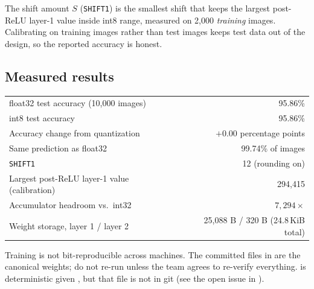\documentclass[11pt]{article}
\begin{document}
The shift amount $S$ (\texttt{SHIFT1}) is the smallest shift that keeps the
largest post-ReLU layer-1 value inside int8 range, measured on 2{,}000
\emph{training} images. Calibrating on training images rather than test images
keeps test data out of the design, so the reported accuracy is honest.

\subsection{Measured results}
\begin{center}
\begin{tabular}{@{}lr@{}}
\toprule
float32 test accuracy (10{,}000 images)        & 95.86\% \\
int8 test accuracy                              & 95.86\% \\
Accuracy change from quantization               & $+0.00$ percentage points \\
Same prediction as float32                     & 99.74\% of images \\
\midrule
\texttt{SHIFT1}                                 & 12 (rounding on) \\
Largest post-ReLU layer-1 value (calibration)   & 294{,}415 \\
Accumulator headroom vs.\ int32                 & $7{,}294\times$ \\
\midrule
Weight storage, layer 1 / layer 2               & 25{,}088 B / 320 B (24.8\,KiB total) \\
\bottomrule
\end{tabular}
\end{center}

\begin{warn}
Training is not bit-reproducible across machines. The committed files in
 are the canonical weights; do not re-run  unless
the team agrees to re-verify everything.  is
deterministic given , but that file is not in git (see the
open issue in ).
\end{warn}
\end{document}
